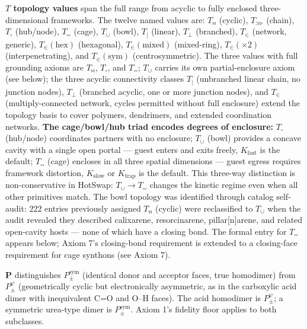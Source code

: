 \documentclass[12pt,a4paper]{article}
\begin{document}
\textbf{$T$ topology values} span the full range from acyclic to fully enclosed three-dimensional frameworks. The twelve named values are: $T_{\bowtie}$ (cyclic), $T_{\ggg}$ (chain), $T_{\square}$ (hub/node), $T_{\square\square}$ (cage), $T_{\cup}$ (bowl), $T_{|}$ (linear), $T_{\perp}$ (branched), $T_{\in}$ (network, generic), $T_{\in}(\text{hex})$ (hexagonal), $T_{\in}(\text{mixed})$ (mixed-ring), $T_{\in}(\times 2)$ (interpenetrating), and $T_{\in}(\text{sym})$ (centrosymmetric). The three values with full grounding axioms are $T_{\bowtie}$, $T_{\square}$, and $T_{\square\square}$; $T_{\cup}$ carries its own partial-enclosure axiom (see below); the three acyclic connectivity classes $T_{|}$ (unbranched linear chain, no junction nodes), $T_{\perp}$ (branched acyclic, one or more junction nodes), and $T_{\in}$ (multiply-connected network, cycles permitted without full enclosure) extend the topology basis to cover polymers, dendrimers, and extended coordination networks. \textbf{The cage/bowl/hub triad encodes degrees of enclosure:} $T_{\square}$ (hub/node) coordinates partners with no enclosure; $T_{\cup}$ (bowl) provides a concave cavity with a single open portal --- guest enters and exits freely, $K_{\text{fast}}$ is the default; $T_{\square\square}$ (cage) encloses in all three spatial dimensions --- guest egress requires framework distortion, $K_{\text{slow}}$ or $K_{\text{trap}}$ is the default. This three-way distinction is non-conservative in HotSwap: $T_{\cup} \to T_{\square\square}$ changes the kinetic regime even when all other primitives match. The bowl topology was identified through catalog self-audit: 222 entries previously assigned $T_{\bowtie}$ (cyclic) were reclassified to $T_{\cup}$ when the audit revealed they described calixarene, resorcinarene, pillar{[}n{]}arene, and related open-cavity hosts --- none of which have a closing bond. The formal entry for $T_{\square\square}$ appears below; Axiom 7's closing-bond requirement is extended to a closing-face requirement for cage synthons (see Axiom 7).

\textbf{P} distinguishes $P_{\pm}^{\text{sym}}$ (identical donor and acceptor faces, true homodimer) from $P_{\pm}^{\psi}$ (geometrically cyclic but electronically asymmetric, as in the carboxylic acid dimer with inequivalent C=O and O--H faces). The acid homodimer is $P_{\pm}^{\psi}$; a symmetric urea-type dimer is $P_{\pm}^{\text{sym}}$. Axiom 1's fidelity floor applies to both subclasses.
\end{document}
